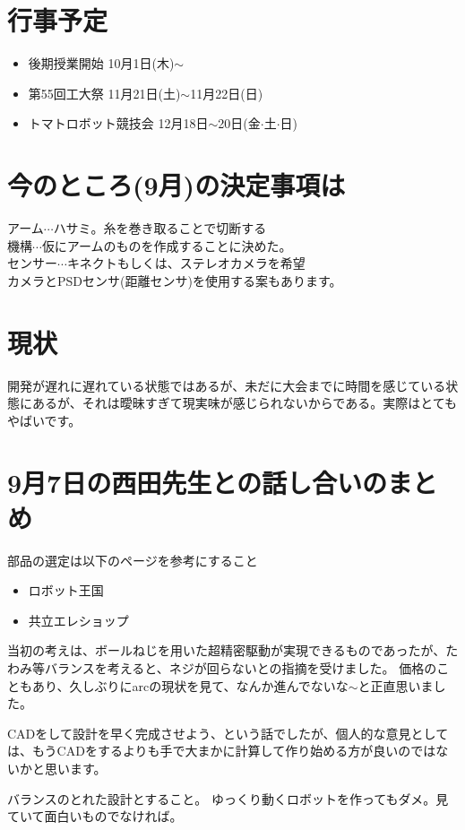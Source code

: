 \section{行事予定}
\begin{itemize}
\item 後期授業開始
10月1日(木)$\sim$
\item 第55回工大祭
11月21日(土)$\sim$11月22日(日)
\item トマトロボット競技会
12月18日$\sim$20日(金$\cdot$土$\cdot$日)
\end{itemize}

\section{今のところ(9月)の決定事項は}
アーム$\cdots$ハサミ。糸を巻き取ることで切断する\\
機構$\cdots$仮にアームのものを作成することに決めた。\\
センサー$\cdots$キネクトもしくは、ステレオカメラを希望\\
カメラとPSDセンサ(距離センサ)を使用する案もあります。\\
\section{現状}
開発が遅れに遅れている状態ではあるが、未だに大会までに時間を感じている状態にあるが、それは曖昧すぎて現実味が感じられないからである。実際はとてもやばいです。

\section{9月7日の西田先生との話し合いのまとめ}
部品の選定は以下のページを参考にすること
\begin{itemize}
\item ロボット王国
\item 共立エレショップ
\end{itemize}

当初の考えは、ボールねじを用いた超精密駆動が実現できるものであったが、たわみ等バランスを考えると、ネジが回らないとの指摘を受けました。
価格のこともあり、久しぶりにarcの現状を見て、なんか進んでないな$\sim$と正直思いました。

CADをして設計を早く完成させよう、という話でしたが、個人的な意見としては、もうCADをするよりも手で大まかに計算して作り始める方が良いのではないかと思います。

バランスのとれた設計とすること。
ゆっくり動くロボットを作ってもダメ。見ていて面白いものでなければ。


